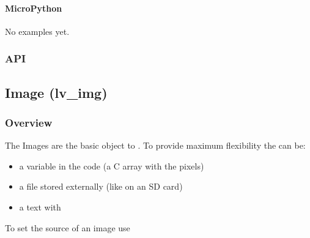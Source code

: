 \documentclass[letterpaper,10pt,english]{sphinxmanual}
\begin{document}
\begin{sphinxVerbatim}[commandchars=\\\{\}]
  
  
  
\end{sphinxVerbatim}


\paragraph{MicroPython}
\label{\detokenize{object-types/gauge:micropython}}
No examples yet.


\subsubsection{API}
\label{\detokenize{object-types/gauge:api}}

\subsection{Image (lv\_img)}
\label{\detokenize{object-types/img:image-lv-img}}\label{\detokenize{object-types/img::doc}}

\subsubsection{Overview}
\label{\detokenize{object-types/img:overview}}
The Images are the basic object to . To provide maximum flexibility the  can be:
\begin{itemize}
\item {} 
a variable in the code (a C array with the pixels)

\item {} 
a file stored externally (like on an SD card)

\item {} 
a text with {\hyperref[\detokenize{overview/fonts::doc}]{}}

\end{itemize}

To set the source of an image use 
\end{document}
